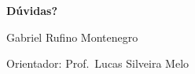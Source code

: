 \documentclass{libs/ufc_format}
\begin{document}
\begin{frame}{}
    \centering
    \huge{\textbf{}}

    \vspace{1cm}

    \Large{\textbf{Dúvidas?}}

    \vspace*{0.8cm}
    \normalsize Gabriel Rufino Montenegro \\
    \vspace{0.2cm}
    \large{}

    \vspace{0.6cm}
    \footnotesize Orientador: Prof.\ Lucas Silveira Melo
\end{frame}
\end{document}
